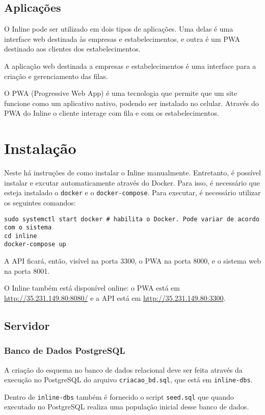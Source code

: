 \documentclass{book}
\begin{document}
\section{Aplicações}
O Inline pode ser utilizado em dois tipos de aplicações. Uma delas é uma
interface web destinada às empresas e estabelecimentos, e outra é um PWA
destinado aos clientes dos estabelecimentos.

A aplicação web destinada a empresas e estabelecimentos é uma interface para a
criação e gerenciamento das filas.

O PWA (Progressive Web App) é uma tecnologia que permite que um site funcione
como um aplicativo nativo, podendo ser instalado no celular. Através do PWA
do Inline o cliente interage com fila e com os estabelecimentos.

\chapter{Instalação}

Neste há instruções de como instalar o Inline manualmente. Entretanto, é
possível instalar e excutar automaticamente através do Docker. Para isso, é
necessário que esteja instalado o \verb|docker| e o \verb|docker-compose|. Para
executar, é necessário utilizar os seguintes comandos:

\begin{verbatim}
sudo systemctl start docker # habilita o Docker. Pode variar de acordo com o sistema
cd inline
docker-compose up
\end{verbatim}

A API ficará, então, visível na porta 3300, o PWA na porta 8000, e o sistema web
na porta 8001.

O Inline também está disponível online: o PWA está em
\url{http://35.231.149.80:8080/} e a API está em \url{http://35.231.149.80:3300}.

\section{Servidor}
\subsection{Banco de Dados PostgreSQL}

A criação do esquema no banco de dados relacional deve ser feita através da
execução no PostgreSQL do arquivo \verb|criacao_bd.sql|, que está em
\verb|inline-dbs|.

Dentro de \verb|inline-dbs| também é fornecido o script \verb|seed.sql| que
quando executado no PostgreSQL realiza uma população inicial desse banco de
dados.
\end{document}
